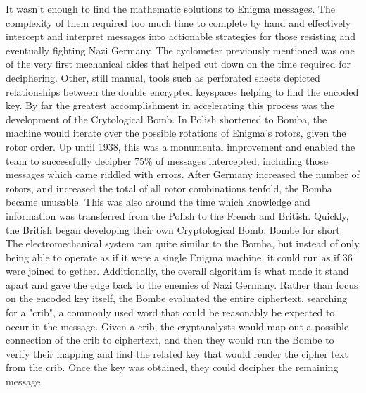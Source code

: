 It wasn't enough to find the mathematic solutions to Enigma messages. The complexity of them required too much time to complete by hand and effectively intercept and interpret messages into actionable strategies for those resisting and eventually fighting Nazi Germany. The cyclometer previously mentioned was one of the very first mechanical aides that helped cut down on the time required for deciphering. Other, still manual, tools such as perforated sheets depicted relationships between the double encrypted keyspaces helping to find the encoded key. By far the greatest accomplishment in accelerating this process was the development of the Crytological Bomb. In Polish shortened to Bomba, the machine would iterate over the possible rotations of Enigma's rotors, given the rotor order. Up until 1938, this was a monumental improvement and enabled the team to successfully decipher 75\% of messages intercepted, including those messages which came riddled with errors. After Germany increased the number of rotors, and increased the total of all rotor combinations tenfold, the Bomba became unusable. This was also around the time which knowledge and information was transferred from the Polish to the French and British. Quickly, the British began developing their own Cryptological Bomb, Bombe for short. The electromechanical system ran quite similar to the Bomba, but instead of only being able to operate as if it were a single Enigma machine, it could run as if 36 were joined to gether. Additionally, the overall algorithm is what made it stand apart and gave the edge back to the enemies of Nazi Germany. Rather than focus on the encoded key itself, the Bombe evaluated the entire ciphertext, searching for a "crib", a commonly used word that could be reasonably be expected to occur in the message. Given a crib, the cryptanalysts would map out a possible connection of the crib to ciphertext, and then they would run the Bombe to verify their mapping and find the related key that would render the cipher text from the crib. Once the key was obtained, they could decipher the remaining message.
